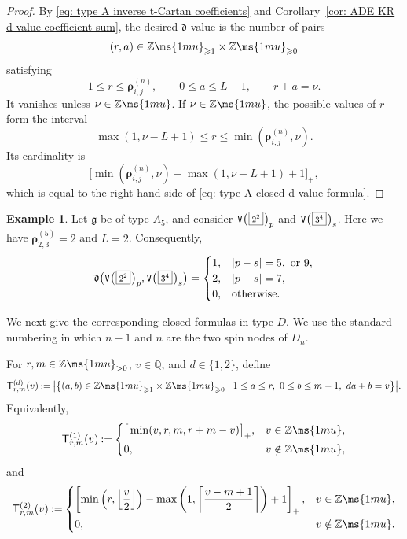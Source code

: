 \documentclass[12pt, leqno]{amsart}
\numberwithin{equation}{section}
\theoremstyle{plain}
\theoremstyle{definition}
\newtheorem{example}[lemma]{Example}
\newcommand{\Vkm}[1]{%
  \ttV\bigl(\hspace{0.2ex}\scalebox{.8}{\(\boxed{#1}\)}\hspace{0.2ex}\bigr)%
}
\renewcommand{\ge}{\geqslant}
\newcommand{\seteq}{\mathbin{:=}}
\newcommand{\g}{\mathfrak{g}}
\newcommand{\Q}{\mathbb{Q}}
\newcommand{\Z}{\mathbb{Z}\ms{1mu}}
\newcommand{\de}{\mathfrak{d}}
\newcommand{\sfT}{\mathsf{T}}
\newcommand{\brho}{{\boldsymbol{\rho}}}
\newcommand{\ttV}{\mathtt{V}}
\begin{document}
\begin{proof}
By \eqref{eq: type A inverse t-Cartan coefficients} and
Corollary~\ref{cor: ADE KR d-value coefficient sum}, the desired
\(\de\)-value is the number of pairs
\[
(r,a)\in\Z_{\ge1} \times \Z_{\ge0}
\]
satisfying
\[
1\leq r\leq\brho^{(n)}_{i,j}, \qquad 0\leq a\leq L-1, \qquad r+a=\nu.
\]
It vanishes unless \(\nu\in\Z\).  If \(\nu\in\Z\), the possible
values of \(r\) form the interval
\[
\max(1,\nu-L+1) \leq r\leq \min(\brho^{(n)}_{i,j},\nu).
\]
Its cardinality is
\[
\bigl[\min(\brho^{(n)}_{i,j},\nu) - \max(1,\nu-L+1)+1]_+,
\]
which is equal to the right-hand side of
\eqref{eq: type A closed d-value formula}.
\end{proof}

\begin{example}\label{ex: type A closed d-value}
Let \(\g\) be of type \(A_5\), and consider $\Vkm{2^2}_p$ and $\Vkm{3^4}_s$.
Here we have
$\brho^{(5)}_{2,3}=2$ and $L=2$. 
Consequently,
\[
\de\bigl( \Vkm{2^2}_p, \Vkm{3^4}_s \bigr)
=
\begin{cases}
1,&|p-s|=5,\text{ or } 9,\\
2,&|p-s|=7,\\
0,&\text{otherwise}.
\end{cases}
\]
\end{example}

We next give the corresponding closed formulas in type \(D\).
We use the standard numbering in which \(n-1\) and \(n\) are the
two spin nodes of \(D_n\).

For \(r,m\in\Z_{>0}\), \(v\in\Q\), and \(d\in\{1,2\}\), define
\begin{equation}\label{eq: closed T}
\sfT^{(d)}_{r,m}(v)
\seteq
\bigl| \bigl\{ (a,b)\in\Z_{\ge1} \times \Z_{\ge0} 
\mid 1\leq a\leq r,\  0\leq b\leq m-1,\  da+b=v \bigr\} \bigr|.
\end{equation}
Equivalently,
\[
\sfT^{(1)}_{r,m}(v)
\seteq
\begin{cases}
\displaystyle \big[ \min(v,r,m,r+m-v) \big]_+, &v\in\Z, \\[1mm]
0,&v\notin\Z,
\end{cases}
\]
and
\[
\sfT^{(2)}_{r,m}(v)
\seteq
\begin{cases}
\displaystyle \left[ \min\left(r,\left\lfloor\frac{v}{2}\right\rfloor\right) -
\max\left(1,\left\lceil\frac{v-m+1}{2}\right\rceil\right) +1 \right]_+, &v\in\Z, \\[3mm]
0,&v\notin\Z.
\end{cases}
\]
\end{document}
